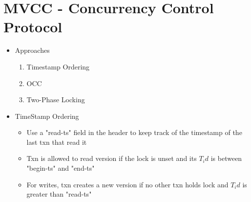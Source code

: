 \documentclass[11pt]{article}
\begin{document}
\section{MVCC - Concurrency Control Protocol}
\begin{itemize}
    \item Approaches
    \begin{enumerate}
        \item Timestamp Ordering
        \item OCC
        \item Two-Phase Locking
    \end{enumerate}
    \item TimeStamp Ordering
    \begin{itemize}
        \item Use a "read-ts" field in the header to keep track of the timestamp of the last txn that read it
        \item Txn is allowed to read version if the lock is unset and its $T_id$ is between "begin-ts" and "end-ts"
        \item For writes, txn creates a new version if no other txn holds lock and $T_id$ is greater than "read-ts"
    \end{itemize}
\end{itemize}
\end{document}
